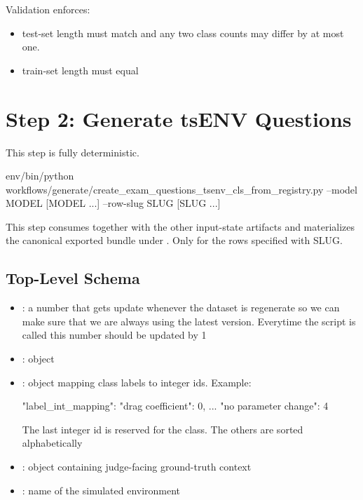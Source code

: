 \documentclass[11pt]{article}
\begin{document}
Validation enforces:
\begin{itemize}
\item test-set length must match  and any two class counts may differ by at most one.
\item train-set length must equal 
\end{itemize}

\section*{Step 2: Generate tsENV Questions}
This step is fully deterministic.
\begin{DocCode}
env/bin/python workflows/generate/create_exam_questions_tsenv_cls_from_registry.py --model MODEL [MODEL ...] --row-slug SLUG [SLUG ...]
\end{DocCode}
This step consumes  together with the other input-state artifacts and materializes the canonical exported bundle under .
Only for the rows specified with SLUG. 




\label{sec:questions-json-schema}
\subsection*{Top-Level \texorpdfstring{}{questions.json} Schema}

\begin{itemize}
\item {}: a number that gets update whenever the dataset is regenerate so we can make sure that we are always using the latest version. Everytime the script is called this number should be updated by 1
\item {}: object 
\item {}: object mapping class labels to integer ids. Example:
\begin{DocCode}
    "label_int_mapping": {
    "drag coefficient": 0,
    ...
    "no parameter change": 4
  }
\end{DocCode}
The last integer id is reserved for the \termNoParameterChangeClass class.
The others are sorted alphabetically
\item {}: object containing judge-facing ground-truth context
\item {}: name of the simulated environment
\end{itemize}
\end{document}

